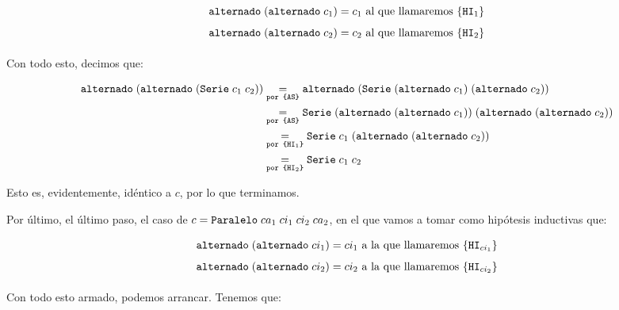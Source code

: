 \begin{equation*}
    \begin{aligned}
        \igualesPor{\alternado \; (\alternado \; c_1)}{c_1 \text{ al que llamaremos \formula{HI$_1$}}}{} \\
        \igualesPor{\alternado \; (\alternado \; c_2)}{c_2 \text{ al que llamaremos \formula{HI$_2$}}}{} \\
    \end{aligned}
\end{equation*}

Con todo esto, decimos que:

\begin{equation*}
    \begin{aligned}
        \igualesPor{\alternado \; (\alternado \; (\serie{c_1}{c_2}))}{\alternado \; (\serie{(\alternado \; c_1)}{(\alternado \; c_2)})}{por \formula{AS}} \\
        \igualesPor{}{\serie{(\alternado \; (\alternado \; c_1))}{(\alternado \; (\alternado \; c_2))}}{por \formula{AS}} \\
        \igualesPor{}{\serie{c_1}{(\alternado \; (\alternado \; c_2))}}{por \formula{HI$_1$}} \\
        \igualesPor{}{\serie{c_1}{c_2}}{por \formula{HI$_2$}} \\
    \end{aligned}
\end{equation*}

Esto es, evidentemente, idéntico a $c$, por lo que terminamos.

Por último, el último paso, el caso de $c = \paralelo{ca_1}{ci_1}{ci_2}{ca_2}$, en el que vamos a tomar como hipótesis inductivas que:

\begin{equation*}
    \begin{aligned}
        \igualesPor{\alternado \; (\alternado \; ci_1)}{ci_1 \text{ a la que llamaremos \formula{HI$_{ci_1}$}}}{} \\
        \igualesPor{\alternado \; (\alternado \; ci_2)}{ci_2 \text{ a la que llamaremos \formula{HI$_{ci_2}$}}}{} \\
    \end{aligned}
\end{equation*}

Con todo esto armado, podemos arrancar. Tenemos que:

